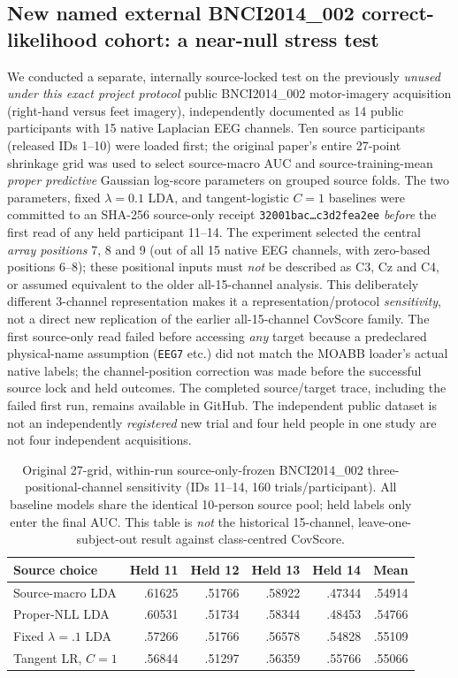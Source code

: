 \subsection{New named external BNCI2014\_002 correct-likelihood cohort: a near-null stress test}
\label{sec:p1-bnci002-corrected-subset}
We conducted a separate, internally source-locked test
on the previously \emph{unused under this exact project
protocol} public BNCI2014\_002 motor-imagery acquisition
(right-hand versus feet imagery), independently
documented as 14 public participants with
15 native Laplacian EEG channels. Ten source
participants (released IDs 1--10) were loaded first;
the original paper's entire 27-point shrinkage grid
was used to select source-macro AUC and
source-training-mean \emph{proper predictive}
Gaussian log-score parameters on grouped source folds.
The two parameters, fixed $\lambda=0.1$ LDA,
and tangent-logistic $C=1$ baselines were
committed to an SHA-256 source-only receipt
\texttt{32001bac\ldots c3d2fea2ee}
\emph{before} the first read of any held
participant 11--14. The experiment selected
the central \emph{array positions} 7, 8 and 9
(out of all 15 native EEG channels, with
zero-based positions 6--8); these positional
inputs must \emph{not} be described as
C3, Cz and C4, or assumed equivalent
to the older all-15-channel analysis.
This deliberately different 3-channel
representation makes it a
representation/protocol \emph{sensitivity},
not a direct new replication of the
earlier all-15-channel CovScore family.
The first source-only read failed
before accessing \emph{any} target because
a predeclared physical-name assumption
(\texttt{EEG7} etc.) did not match the
MOABB loader's actual native labels;
the channel-position correction was
made before the successful source lock
and held outcomes. The completed
source/target trace, including the failed
first run, remains available in GitHub.
The independent public dataset is not
an independently \emph{registered} new
trial and four held people in one study
are not four independent acquisitions.

\begin{table}[ht]\centering\small
\caption{Original 27-grid, within-run
source-only-frozen BNCI2014\_002
three-positional-channel sensitivity
(IDs 11--14, 160 trials/participant).
All baseline models share the
identical 10-person source pool;
held labels only enter the final AUC.
This table is \emph{not} the historical
15-channel, leave-one-subject-out result
against class-centred CovScore.}
\label{tab:p1-bnci002-proper-source}
\begin{tabular}{lrrrrr}
\toprule
Source choice & Held 11 & Held 12 & Held 13 & Held 14 & Mean\\
\midrule
Source-macro LDA & .61625 & .51766 & .58922 & .47344 & .54914\\
Proper-NLL LDA & .60531 & .51734 & .58344 & .48453 & .54766\\
Fixed $\lambda=.1$ LDA & .57266 & .51766 & .56578 & .54828 & .55109\\
Tangent LR, $C=1$ & .56844 & .51297 & .56359 & .55766 & .55066\\
\bottomrule
\end{tabular}
\end{table}

